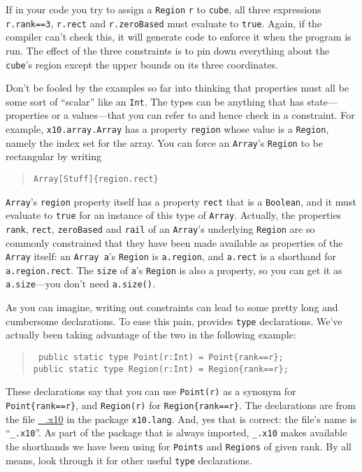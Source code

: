 If in your code you try to assign a  {\tt Region} {\tt r} to {\tt cube},
all three expressions {\tt r.rank==3}, {\tt r.rect} and {\tt r.zeroBased}
must evaluate to {\tt true}.  Again, if the compiler can't check this,
it will generate code to enforce it when the program is run.
The effect of the three
constraints is to pin down everything about the {\tt cube}'s region except the
upper bounds on its three coordinates.

Don't be fooled by
the examples so far into thinking that properties must all be
some sort of ``scalar'' like an {\tt Int}.  The types can be anything
that has state---properties or a values---that you 
can refer to and hence check in a constraint.   For example,
{\tt x10.array.Array} has a property {\tt region} whose
value is a {\tt Region}, namely the index set for the array.
You can force an {\tt Array}'s {\tt Region} to be rectangular by writing
\begin{quote}
{\tt Array[Stuff]\{region.rect\}}
\end{quote}
{\tt Array}'s  {\tt region} property itself has a property
{\tt rect} that is a {\tt Boolean}, and it must evaluate to {\tt true} for
an instance of this type of {\tt Array}. Actually, the properties
{\tt rank}, {\tt rect}, {\tt zeroBased} and {\tt rail}
of an {\tt Array}'s underlying {\tt Region} are so commonly 
constrained that they have been made available as
properties of the {\tt Array} itself: an {\tt Array a}'s
{\tt Region} is {\tt a.region}, and {\tt a.rect} is a shorthand for {\tt a.region.rect}.
The {\tt size} of {\tt a}'s {\tt Region} is also a property, so you can get it as
{\tt a.size}---you don't need {\tt a.size()}. 

As you can imagine, writing out constraints can lead to some pretty
long and cumbersome declarations.  To ease this pain, \Xten{} provides
{\tt type} declarations.   We've actually been taking advantage of
the two in the following example:
\begin{quote}{\tt
   public static type Point(r:Int) = Point\{rank==r\};\\
   public static type Region(r:Int) = Region\{rank==r\};}
\end{quote}

These declarations say that you can use {\tt Point(r)} as a synonym
for {\tt Point\{rank==r\}}, and {\tt Region(r)} for {\tt Region\{rank==r\}}.
The declarations are from the file \href{????}{\_.x10} in the package
{\tt x10.lang}.  And, yes that is correct: the file's name is ``{\tt \_.x10}''.
As part of the package that is always imported, {\tt\_.x10} makes available the
shorthands we have been using for {\tt Points} and {\tt Regions} of given
rank.  By all means, look through it for other useful {\tt type} declarations.
  
